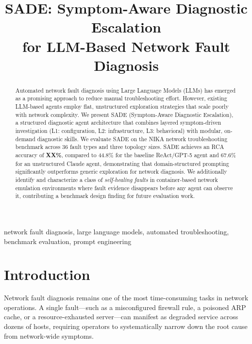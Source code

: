\documentclass[conference]{IEEEtran}
\begin{document}
\title{SADE: Symptom-Aware Diagnostic Escalation\\for LLM-Based Network Fault Diagnosis}

\author{
\IEEEauthorblockA{[Affiliation]\\
[Email]}
}

\maketitle

\begin{abstract}
Automated network fault diagnosis using Large Language Models (LLMs) has emerged as a promising approach to reduce manual troubleshooting effort. However, existing LLM-based agents employ flat, unstructured exploration strategies that scale poorly with network complexity. We present SADE (Symptom-Aware Diagnostic Escalation), a structured diagnostic agent architecture that combines layered symptom-driven investigation (L1: configuration, L2: infrastructure, L3: behavioral) with modular, on-demand diagnostic skills. We evaluate SADE on the NIKA network troubleshooting benchmark across 36 fault types and three topology sizes. SADE achieves an RCA accuracy of \textbf{XX\%}, compared to 44.8\% for the baseline ReAct/GPT-5 agent and 67.6\% for an unstructured Claude agent, demonstrating that domain-structured prompting significantly outperforms generic exploration for network diagnosis. We additionally identify and characterize a class of \emph{self-healing faults} in container-based network emulation environments where fault evidence disappears before any agent can observe it, contributing a benchmark design finding for future evaluation work.
\end{abstract}

\begin{IEEEkeywords}
network fault diagnosis, large language models, automated troubleshooting, benchmark evaluation, prompt engineering
\end{IEEEkeywords}

\section{Introduction}

Network fault diagnosis remains one of the most time-consuming tasks in network operations. A single fault---such as a misconfigured firewall rule, a poisoned ARP cache, or a resource-exhausted server---can manifest as degraded service across dozens of hosts, requiring operators to systematically narrow down the root cause from network-wide symptoms.
\end{document}
